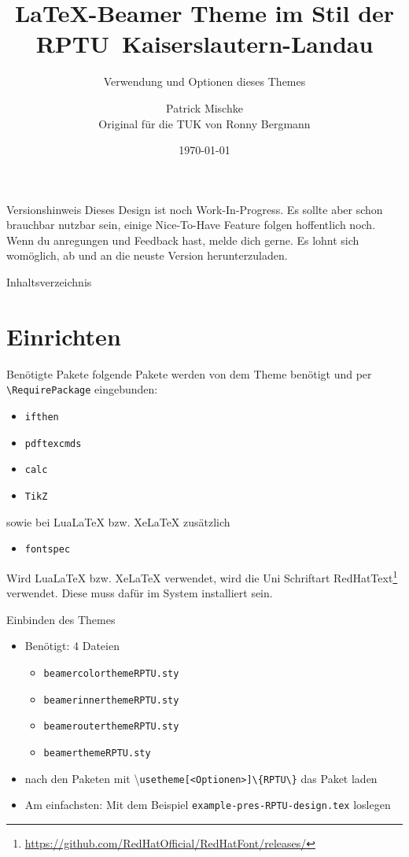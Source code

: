 \documentclass[german,10pt,xcolor=colortbl,compress
]{beamer}
\title{\LaTeX-Beamer Theme im Stil der \mbox{RPTU Kaiserslautern-Landau}}
\subtitle{Verwendung und Optionen dieses Themes}
\date[]{\today}
\author[P. Mischke]{Patrick Mischke\\Original für die TUK von Ronny Bergmann}
\institute[]{AG Ott\\FB Physik\\RPTU Kaiserslautern}
\begin{document}
\begin{frame}{Versionshinweis}
	Dieses Design ist noch Work-In-Progress. Es sollte aber schon brauchbar nutzbar sein, einige Nice-To-Have Feature folgen hoffentlich noch. \\
	Wenn du anregungen und Feedback hast, melde dich gerne. Es lohnt sich womöglich, ab und an die neuste Version herunterzuladen.
\end{frame}
\maketitle
\begin{frame}{Inhaltsverzeichnis}
	\tableofcontents
\end{frame}
\section{Einrichten}
\begin{frame}[fragile]{Benötigte Pakete}
	folgende Pakete werden von dem Theme benötigt und per \lstinline!\RequirePackage! eingebunden:
	\begin{itemize}
		\item \lstinline!ifthen!
		\item \lstinline!pdftexcmds!
		\item \lstinline!calc!
		\item \lstinline!TikZ!
	\end{itemize}\vspace{\baselineskip}
	sowie bei LuaLaTeX bzw. XeLaTeX zusätzlich
	\begin{itemize}
		\item \lstinline!fontspec!
	\end{itemize}\vspace{\baselineskip}
	Wird LuaLaTeX bzw. XeLaTeX verwendet, wird die Uni Schriftart RedHatText\footnote{\url{https://github.com/RedHatOfficial/RedHatFont/releases/}} verwendet.
	Diese muss dafür im System installiert sein.
\end{frame}
\begin{frame}{Einbinden des Themes}
	\begin{itemize}
		\item Benötigt: 4 Dateien
		      \begin{itemize}
			      \item \lstinline|beamercolorthemeRPTU.sty|
			      \item \lstinline|beamerinnerthemeRPTU.sty|
			      \item \lstinline!beamerouterthemeRPTU.sty!
			      \item \lstinline|beamerthemeRPTU.sty|
		      \end{itemize}

		\item nach den Paketen mit \textbackslash\lstinline|usetheme[<Optionen>]\{RPTU\}| das Paket laden
		\item Am einfachsten: Mit dem Beispiel \lstinline!example-pres-RPTU-design.tex! loslegen
	\end{itemize}
\end{frame}
\end{document}
